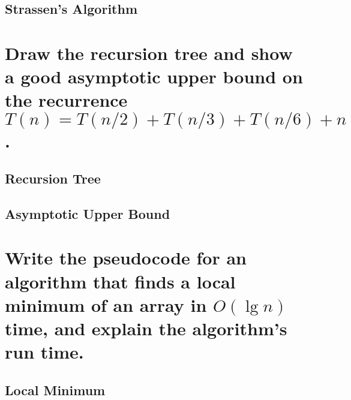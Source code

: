 \subsection{Strassen's Algorithm}

\section{Draw the recursion tree and show a good asymptotic upper bound on the recurrence $T(n) = T(n/2) + T(n/3) + T(n/6) + n$.}
\subsection{Recursion Tree}
\subsection{Asymptotic Upper Bound}

\section{Write the pseudocode for an algorithm that finds a local minimum of an array in $O(\lg n)$ time, and explain the algorithm's run time.}
\subsection{Local Minimum}



